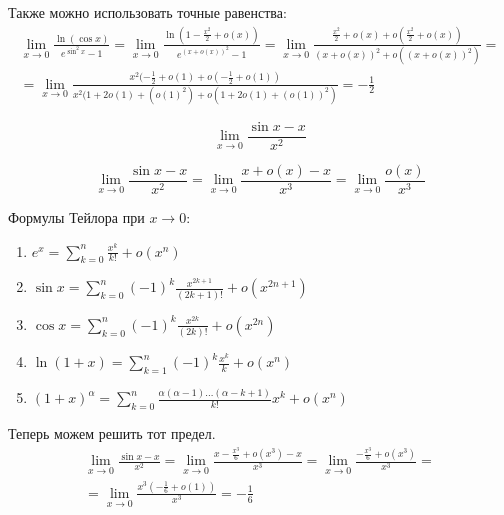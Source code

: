 Также можно использовать точные равенства:
\begin{gather*}
    \lim\limits_{x \to 0} \frac{\ln ( \cos x ) }{e^{\sin^2 x} - 1}
    =
    \lim\limits_{x \to 0} \frac{\ln ( 1 - \frac{x^2}{2} + o(x) ) }{e^{( x + o(x) )^2} - 1}
    =
    \lim\limits_{x \to 0} \frac{\frac{x^2}{2} + o(x) + o(\frac{x^2}{2} + o(x))}{( x + o(x) )^2 + o(( x + o(x) )^2)}
    =
    \\
    =
    \lim\limits_{x \to 0} 
        \frac{ x^2 (-\frac{1}{2} + o(1) + o(-\frac{1}{2} + o(1))}{x^2 (1 + 2o(1) + (o(1)^2) + o(1 + 2o(1) + (o(1))^2)}
    =
    -\frac{1}{2}
\end{gather*}

\begin{example}{}{}
    \[
        \lim\limits_{x \to 0} \frac{\sin x - x}{x^2}
    \]
\end{example}
\[
    \lim\limits_{x \to 0} \frac{\sin x - x}{x^2}
    =
    \lim\limits_{x \to 0} \frac{x + o(x) - x}{x^3}
    =
    \lim\limits_{x \to 0} \frac{o(x)}{x^3}
\]

\newpage

Формулы Тейлора при \( x \to 0 \):
\begin{enumerate}
    \item
        \( 
            \displaystyle
            e^x = \sum\limits_{k = 0}^n \frac{x^k}{k!} + o(x^n) 
        \)
    \item
        \( 
            \displaystyle
            \sin x = \sum\limits_{k = 0}^n (-1)^k \frac{x^{2k + 1}}{(2k + 1)!} + o(x^{2n + 1}) 
        \)
    \item
        \( 
            \displaystyle
            \cos x = \sum\limits_{k = 0}^n (-1)^k \frac{x^{2k}}{(2k)!} + o(x^{2n}) 
        \)
    \item
        \( 
            \displaystyle
            \ln (1 + x) = \sum\limits_{k = 1}^n (-1)^k \frac{x^k}{k} + o(x^n) 
        \)
    \item
        \(
            \displaystyle
            (1 + x)^\alpha = \sum\limits_{k = 0}^n \frac{\alpha (\alpha - 1) \ldots (\alpha - k + 1)}{k!} x^k + o(x^n)
        \)
\end{enumerate}

Теперь можем решить тот предел.
\begin{gather*}
    \lim\limits_{x \to 0} \frac{\sin x - x}{x^2}
    =
    \lim\limits_{x \to 0} \frac{x - \frac{x^3}{6} + o(x^3) - x}{x^3}
    =
    \lim\limits_{x \to 0} \frac{-\frac{x^3}{6} + o(x^3)}{x^3}
    =
    \\
    =
    \lim\limits_{x \to 0} \frac{x^3 ( -\frac{1}{6} + o(1) ) }{x^3}
    =
    -\frac{1}{6}
\end{gather*}

